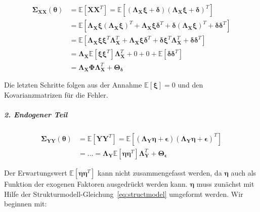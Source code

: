 \documentclass{article}
\numberwithin{equation}{section}
\begin{document}
\begin{equation}
\label{eq:kovar-xx}
\begin{split}
\boldsymbol\Sigma_{\mathbf{XX}}(\boldsymbol\theta) &= \mathbb{E} \left[ \mathbf{XX}^T \right] = \mathbb{E} \left[ (\boldsymbol\Lambda_{\mathbf{X}} \boldsymbol\xi + \boldsymbol\delta) (\boldsymbol\Lambda_{\mathbf{X}} \boldsymbol\xi + \boldsymbol\delta)^T \right]\\
&= \mathbb{E} \left[ \boldsymbol\Lambda_{\mathbf{X}} \boldsymbol\xi (\boldsymbol\Lambda_{\mathbf{X}} \boldsymbol\xi)^T + \boldsymbol\Lambda_{\mathbf{X}} \boldsymbol\xi \boldsymbol\delta^T + \boldsymbol\delta (\boldsymbol\Lambda_{\mathbf{X}} \boldsymbol\xi)^T +\boldsymbol{\delta\delta}^T \right]\\
&= \mathbb{E} \left[ \boldsymbol\Lambda_{\mathbf{X}} \boldsymbol\xi \boldsymbol\xi^T \boldsymbol\Lambda_{\mathbf{X}}^T + \boldsymbol\Lambda_{\mathbf{X}} \boldsymbol\xi \boldsymbol\delta^T + \boldsymbol\delta \boldsymbol\xi^T \boldsymbol\Lambda_{\mathbf{X}}^T +\boldsymbol{\delta\delta}^T \right]\\
&= \boldsymbol\Lambda_{\mathbf{X}} \mathbb{E} \left[ \boldsymbol{\xi\xi}^T \right] \boldsymbol\Lambda_{\mathbf{X}}^T + 0 + 0 + \mathbb{E} \left[ \boldsymbol{\delta\delta}^T \right]\\
&= \boldsymbol\Lambda_{\mathbf{X}} \boldsymbol\Phi \boldsymbol\Lambda_{\mathbf{X}}^T + \boldsymbol\Theta_{\boldsymbol\delta}
\end{split}
\end{equation}

Die letzten Schritte folgen aus der Annahme $\mathbb{E}[\boldsymbol\xi] = 0$ und den Kovarianzmatrizen für die Fehler.

\subparagraph*{2. Endogener Teil}

\begin{equation}
\label{eq:endo-1}
\begin{split}
\boldsymbol\Sigma_{\mathbf{YY}}(\boldsymbol\theta) &= \mathbb{E} \left[ \mathbf{YY}^T \right] =  \mathbb{E} \left[ (\boldsymbol\Lambda_{\mathbf{Y}} \boldsymbol\eta + \boldsymbol\epsilon) (\boldsymbol\Lambda_{\mathbf{Y}} \boldsymbol\eta + \boldsymbol\epsilon)^T \right]\\
&= \dots = \boldsymbol\Lambda_{\mathbf{Y}} \mathbb{E} \left[ \boldsymbol{\eta\eta}^T \right] \boldsymbol\Lambda_{\mathbf{Y}}^T + \boldsymbol\Theta_{\boldsymbol\epsilon}
\end{split}
\end{equation}

Der Erwartungswert $\mathbb{E} \left[ \boldsymbol{\eta\eta}^T \right]$ kann nicht zusammengefasst werden, da $\boldsymbol\eta$ auch als Funktion der exogenen Faktoren ausgedrückt werden kann. $\boldsymbol\eta$ muss zunächst mit Hilfe der Strukturmodell-Gleichung~\ref{eq:structmodel} umgeformt werden. Wir beginnen mit:
\end{document}
